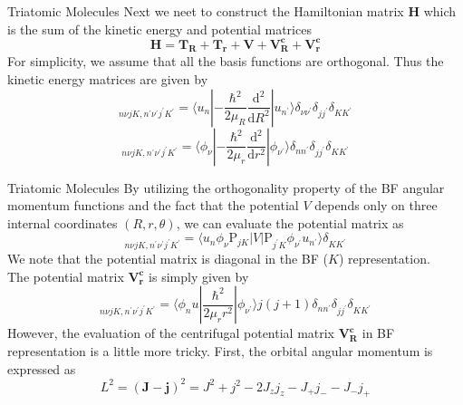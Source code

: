 \documentclass{beamer}
\begin{document}
	\begin{frame}{Triatomic Molecules}
		Next we neet to construct the Hamiltonian matrix $\mathbf{H}$ which is the sum of the kinetic energy and potential matrices
		\begin{equation}
			\mathbf{H}=\mathbf{T_R}+\mathbf{T_r}+\mathbf{V}+\mathbf{V_R^c}+\mathbf{V_r^c}
		\end{equation}
		For simplicity, we assume that all the basis functions are orthogonal. Thus the kinetic energy matrices are given by
		\begin{equation}
			[\mathbf{T_R}]_{n\nu jK,n^\prime\nu^\prime j^\prime K^\prime}=\langle u_n|-\dfrac{\hbar^2}{2\mu_R}\dfrac{\mathrm{d}^2}{\mathrm{d}R^2}|u_{n^\prime}\rangle\delta_{\nu\nu^\prime}\delta_{jj^\prime}\delta_{KK^\prime}
		\end{equation}
		\begin{equation}
			[\mathbf{T_r}]_{n\nu jK,n^\prime\nu^\prime j^\prime K^\prime}=\langle \phi_\nu|-\dfrac{\hbar^2}{2\mu_r}\dfrac{\mathrm{d}^2}{\mathrm{d}r^2}|\phi_{\nu^\prime}\rangle\delta_{nn^\prime}\delta_{jj^\prime}\delta_{KK^\prime}
		\end{equation}
	\end{frame}
	\begin{frame}{Triatomic Molecules}
		By utilizing the orthogonality property of the BF angular momentum functions and the fact that the potential $V$ depends only on three internal coordinates $(R,r,\theta)$, we can evaluate the potential matrix as
		\begin{equation}
			[\mathbf{V}]_{n\nu jK,n^\prime\nu^\prime j^\prime K^\prime}=\langle u_n\phi_\nu\mathrm{P}_{jK}|V|\mathrm{P}_{j^\prime K}\phi_{\nu^\prime}u_{n^\prime}\rangle\delta_{KK^\prime}
		\end{equation}
		We note that the potential matrix is diagonal in the BF ($K$) representation.\\
		The potential matrix $\mathbf{V_r^c}$ is simply given by
		\begin{equation}
			[\mathbf{V_r^c}]_{n\nu jK,n^\prime\nu^\prime j^\prime K^\prime}=\langle\phi_nu|\dfrac{\hbar^2}{2\mu_rr^2}|\phi_{\nu^\prime}\rangle j(j+1)\delta_{nn^\prime}\delta_{jj^\prime}\delta_{KK^\prime}
		\end{equation}
		However, the evaluation of the centrifugal potential matrix $\mathbf{V_R^c}$ in BF representation is a little more tricky. First, the orbital angular momentum is expressed as
		\begin{equation}
			L^2=(\mathbf{J}-\mathbf{j})^2=J^2+j^2-2J_zj_z-J_+j_--J_-j_+
		\end{equation}
	\end{frame}
\end{document}
